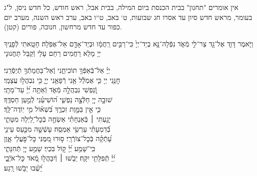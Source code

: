 \documentclass[twoside, openany, parskip=half, 11pt]{book}
\begin{document}
\newcommand{\nefilasapayim}{

וַיֹּ֧אמֶר דָּוִ֛ד אֶל־גָּ֖ד צַר־לִ֣י מְֿאֹ֑ד נִפְּֿלָה־נָּ֤א בְיַד־יְיָ֙ כִּֽי־רַבִּ֣ים רַֽחֲמָ֔ו וּבְיַד־אָדָ֖ם אַל־אֶפֹּֽלָה׃
\firstword{רַחוּם וְֿחַנּוּן,}
חָטָֽאתִי לְֿפָנֶֽיךָ יְיָ מָלֵא רַחֲמִים רַחֵם עָלַי וְֿקַבֵּל תַּחֲנוּנָי
\begin{narrow}
יְיָ֗ אַל־בְּֿאַפְּֿךָ֥ תוֹכִיחֵ֑נִי \hfill וְֽֿאַל־בַּחֲמָתְֿךָ֥ תְֿיַסְּֿרֵֽנִי׃ \\
חׇנֵּ֥נִי יְיָ כִּ֤י אֻמְלַ֫ל אָ֥נִי \hfill רְֿפָאֵ֥נִי יְיָ֑ כִּ֖י נִבְהֲל֣וּ עֲצָמָֽי׃ \\
וְֿ֭נַפְשִׁי נִבְהֲלָ֣ה מְֿאֹ֑ד \hfill וְֿאַתָּ֥ה יְ֝יָ֗ עַד־מָתָֽי׃ \\
שׁוּבָ֣ה יְיָ֭ חַלְּֿצָ֣ה נַפְשִׁ֑י \hfill ה֝וֹשִׁיעֵ֗נִי לְֿמַ֣עַן חַסְדֶּֽךָ׃ \\
כִּ֤י אֵ֣ין בַּמָּ֣וֶת זִכְרֶ֑ךָ \hfill בִּ֝שְׁא֗וֹל מִ֣י יֽוֹדֶה־לָּֽךְ׃ \\
יָגַ֤עְתִּי ׀ בְּֽֿאַנְחָתִ֗י \hfill אַשְׂחֶ֣ה בְֿכׇל־לַ֭יְלָה מִטָּתִ֑י\\ בְּֿ֝דִמְעָתִ֗י עַרְשִׂ֥י אַמְסֶֽה׃ \hfill
עָשְֿׁשָׁ֣ה מִכַּ֣עַס עֵינִ֑י \\ עָ֝תְֿקָ֗ה בְּֿכׇל־צוֹרְֿרָֽי׃ \hfill
ס֣וּרוּ מִ֭מֶּנִּי כׇּל־פֹּ֣עֲלֵי אָ֑וֶן \\ כִּֽי־שָׁמַ֥ע יְ֝יָ֗ ק֣וֹל בִּכְיִֽי׃ \hfill
שָׁמַ֣ע יְיָ֭ תְּֿחִנָּתִ֑י \\ יְ֝יָ֗ תְּֽֿפִלָּתִ֥י יִקָּֽח׃ \hfill
יֵבֹ֤שׁוּ ׀ וְֿיִבָּהֲל֣וּ מְֿ֭אֹד כׇּל־אֹיְֿבָ֑י \\ יָ֝שֻׁ֗בוּ יֵבֹ֥שׁוּ רָֽגַע׃ \hfill \break
\end{narrow}\negline
}



\begin{scriptsize}

\textsf{
אין אומרים "תחנון" בבית הכנסת ביום המילה, בבית אבל, ראש חודש, כל חדש ניסן, ל"ג בעומר, מראש חדש סיון עד אסרו חג שבועות, ט` באב, ט``ו באב, ערב ראש השנה, מערב יום כפור עד חדש מרחשון, חנוכה, פורים (קטן).
}

\end{scriptsize}
\nefilasapayim \label{nefilas_apayim}

\negline
\end{document}
